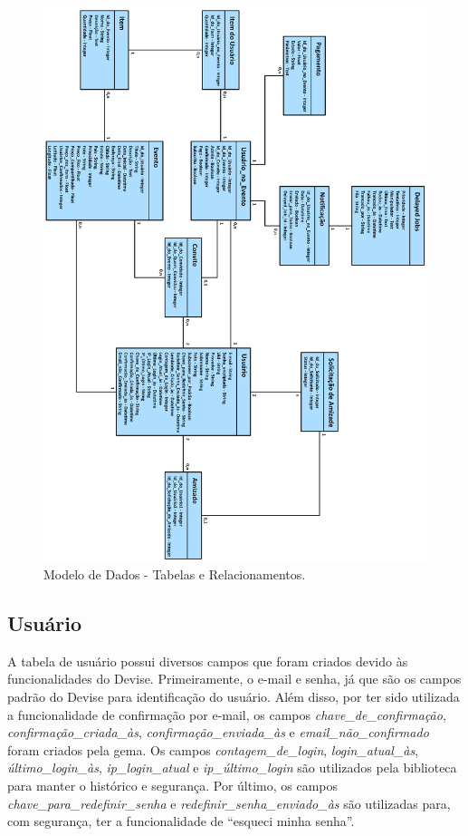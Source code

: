 \begin{figure}[H]
\centering
\includegraphics[width=1\textwidth]{figs/modelo_de_dados}
\caption[\textit{Modelo de Dados - Tabelas e Relacionamentos}.]
{Modelo de Dados - Tabelas e Relacionamentos.}
\label{fig:Modelo de Dados - Tabelas e Relacionamentos}
\end{figure}

\subsection{Usuário}

A tabela de usuário possui diversos campos que foram criados devido às funcionalidades do Devise. Primeiramente, o e-mail e senha, já que são os campos padrão do Devise para identificação do usuário. Além disso, por ter sido utilizada a funcionalidade de confirmação por e-mail, os campos \textit{chave\_de\_confirmação}, \textit{confirmação\_criada\_às}, \textit{confirmação\_enviada\_às} e \textit{email\_não\_confirmado} foram criados pela gema. Os campos \textit{contagem\_de\_login}, \textit{login\_atual\_às}, \textit{último\_login\_às}, \textit{ip\_login\_atual} e \textit{ip\_último\_login} são utilizados pela biblioteca para manter o histórico e segurança. Por último, os campos \textit{chave\_para\_redefinir\_senha} e \textit{redefinir\_senha\_enviado\_às} são utilizadas para, com segurança, ter a funcionalidade de ``esqueci minha senha''.

